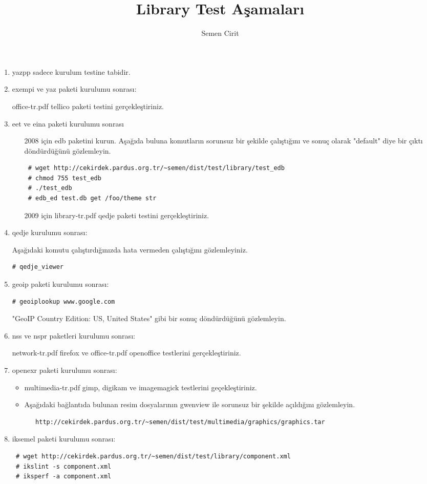 \documentclass[a4paper,10pt]{article}
\title{Library Test Aşamaları}
\author{Semen Cirit}
\begin{document}
\maketitle
\begin{enumerate}
\item yazpp sadece kurulum testine tabidir.
\item exempi ve yaz paketi kurulumu sonrası:

office-tr.pdf tellico paketi testini gerçekleştiriniz.

\item eet ve eina paketi kurulumu sonrası
\begin{itemize}
 \item [2008 için] edb paketini kurun. Aşağıda buluna komutların sorunsuz bir şekilde çalıştığını ve sonuç olarak "default" diye bir çıktı döndürdüğünü gözlemleyin.
\begin{verbatim}
 # wget http://cekirdek.pardus.org.tr/~semen/dist/test/library/test_edb
 # chmod 755 test_edb
 # ./test_edb
 # edb_ed test.db get /foo/theme str
\end{verbatim}
\item [2009 için] library-tr.pdf qedje paketi testini gerçekleştiriniz.
\end{itemize}

\item qedje kurulumu sonrası:

Aşağıdaki komutu çalıştırdığınızda hata vermeden çalıştığını gözlemleyiniz.
\begin{verbatim}
# qedje_viewer
\end{verbatim}

\item geoip paketi kurulumu sonrası:
\begin{verbatim}
# geoiplookup www.google.com 
\end{verbatim}
"GeoIP Country Edition: US, United States" gibi bir sonuç döndürdüğünü gözlemleyin.

\item nss ve nspr paketleri kurulumu sonrası:

network-tr.pdf firefox ve office-tr.pdf openoffice testlerini gerçekleştiriniz.

\item openexr paketi kurulumu sonrası:
\begin{itemize}
 \item multimedia-tr.pdf gimp, digikam ve imagemagick testlerini geçekleştiriniz.
 \item Aşağıdaki bağlantıda bulunan resim dosyalarının gwenview ile sorunsuz bir şekilde açıldığını gözlemleyin.
  \begin{verbatim}
   http://cekirdek.pardus.org.tr/~semen/dist/test/multimedia/graphics/graphics.tar
  \end{verbatim}
\end{itemize}
\item iksemel paketi kurulumu sonrası:
\begin{verbatim}
 # wget http://cekirdek.pardus.org.tr/~semen/dist/test/library/component.xml
 # ikslint -s component.xml
 # iksperf -a component.xml 
\end{verbatim}



\end{enumerate}
\end{document}
